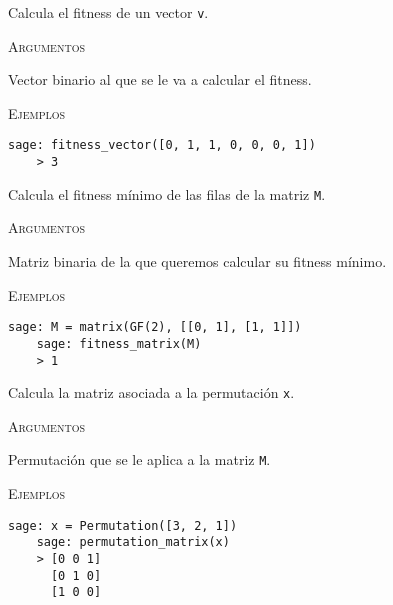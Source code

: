 \begin{description}[leftmargin=1em, font=\normalfont\ttfamily, style=nextline]
  \item[fitness\_vector(v)]

  Calcula el fitness de un vector \texttt{v}.

  \textsc{Argumentos}
  \begin{description}[font=\normalfont\ttfamily]
    \item[v] Vector binario al que se le va a calcular el fitness. 
  \end{description}

  \textsc{Ejemplos}
  \begin{lstlisting}[gobble=4]
    sage: fitness_vector([0, 1, 1, 0, 0, 0, 1])
    > 3
  \end{lstlisting}

  \item[fitness\_matrix(M)]

  Calcula el fitness mínimo de las filas de la matriz \texttt{M}.

  \textsc{Argumentos}
  \begin{description}[font=\normalfont\ttfamily]
    \item[M] Matriz binaria de la que queremos calcular su fitness mínimo.
  \end{description}

  \textsc{Ejemplos}
  \begin{lstlisting}[gobble=4]
    sage: M = matrix(GF(2), [[0, 1], [1, 1]])
    sage: fitness_matrix(M)
    > 1
  \end{lstlisting}

  \item[permutation\_matrix(x)]  
  Calcula la matriz asociada a la permutación \texttt{x}.

  \textsc{Argumentos}
  \begin{description}[font=\normalfont\ttfamily]
    \item[x] Permutación que se le aplica a la matriz \texttt{M}.
  \end{description}

  \textsc{Ejemplos}
  \begin{lstlisting}[gobble=4]
    sage: x = Permutation([3, 2, 1])
    sage: permutation_matrix(x)
    > [0 0 1]
      [0 1 0]
      [1 0 0]
  \end{lstlisting}

  \item[fitness\_permutation(M, x)]


\end{description}
